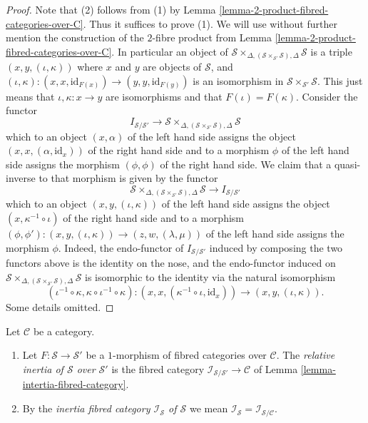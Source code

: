 \begin{proof}
Note that (2) follows from (1) by
Lemma \ref{lemma-2-product-fibred-categories-over-C}.
Thus it suffices to prove (1).
We will use without further mention the construction of the $2$-fibre product
from
Lemma \ref{lemma-2-product-fibred-categories-over-C}.
In particular an object of
$\mathcal{S}
\times_{\Delta, (\mathcal{S} \times_{\mathcal{S}'} \mathcal{S}), \Delta}
\mathcal{S}$
is a triple $(x, y, (\iota, \kappa))$ where $x$ and $y$ are objects of
$\mathcal{S}$, and
$(\iota, \kappa) : (x, x, \text{id}_{F(x)}) \to (y, y, \text{id}_{F(y)})$
is an isomorphism in $\mathcal{S} \times_{\mathcal{S}'} \mathcal{S}$.
This just means that $\iota, \kappa : x \to y$ are isomorphisms and that
$F(\iota) = F(\kappa)$. Consider the functor
$$
I_{\mathcal{S}/\mathcal{S}'}
\longrightarrow
\mathcal{S}
\times_{\Delta, (\mathcal{S} \times_{\mathcal{S}'} \mathcal{S}), \Delta}
\mathcal{S}
$$
which to an object $(x, \alpha)$ of the left hand side assigns the object
$(x, x, (\alpha, \text{id}_x))$ of the right hand side
and to a morphism $\phi$ of the left hand side
assigns the morphism $(\phi, \phi)$ of the right hand side.
We claim that a quasi-inverse to that morphism is given by the
functor
$$
\mathcal{S}
\times_{\Delta, (\mathcal{S} \times_{\mathcal{S}'} \mathcal{S}), \Delta}
\mathcal{S}
\longrightarrow
I_{\mathcal{S}/\mathcal{S}'}
$$
which to an object $(x, y, (\iota, \kappa))$ of the left hand side
assigns the object $(x, \kappa^{-1} \circ \iota)$ of the right hand side
and to a morphism
$(\phi, \phi') : (x, y, (\iota, \kappa)) \to (z, w, (\lambda, \mu))$
of the left hand side assigns the morphism $\phi$.
Indeed, the endo-functor of $I_{\mathcal{S}/\mathcal{S}'}$ induced
by composing the two functors above is the identity on the nose, and
the endo-functor induced on
$\mathcal{S}
\times_{\Delta, (\mathcal{S} \times_{\mathcal{S}'} \mathcal{S}), \Delta}
\mathcal{S}$
is isomorphic to
the identity via the natural isomorphism
$$
(\iota^{-1} \circ \kappa, \kappa \circ \iota^{-1} \circ \kappa) :
(x, x, (\kappa^{-1} \circ \iota, \text{id}_x))
\longrightarrow
(x, y, (\iota, \kappa)).
$$
Some details omitted.
\end{proof}

\begin{definition}
\label{definition-inertia-fibred-category}
Let $\mathcal{C}$ be a category.
\begin{enumerate}
\item Let $F : \mathcal{S} \to \mathcal{S}'$ be a $1$-morphism of
fibred categories over $\mathcal{C}$. The {\it relative inertia
of $\mathcal{S}$ over $\mathcal{S}'$} is the fibred category
$\mathcal{I}_{\mathcal{S}/\mathcal{S}'} \to \mathcal{C}$ of
Lemma \ref{lemma-intertia-fibred-category}.
\item By the {\it inertia fibred category $\mathcal{I}_\mathcal{S}$
of $\mathcal{S}$} we mean
$\mathcal{I}_\mathcal{S} = \mathcal{I}_{\mathcal{S}/\mathcal{C}}$.
\end{enumerate}
\end{definition}

